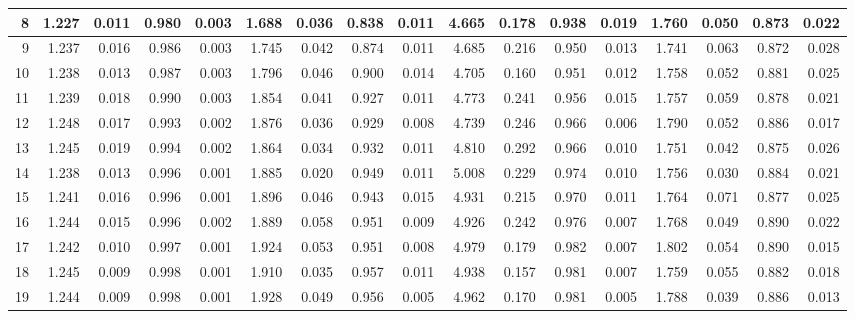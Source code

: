 \documentclass[
]{article}
\begin{document}
\begin{table}[H]
{\begin{tabular}[t]{r|r|r|r|r|r|r|r|r|r|r|r|r|r|r|r|r}
\hline
\hspace{1em}8 & 1.227 & 0.011 & 0.980 & 0.003 & 1.688 & 0.036 & 0.838 & 0.011 & 4.665 & 0.178 & 0.938 & 0.019 & 1.760 & 0.050 & 0.873 & 0.022\\
\hline
\hspace{1em}9 & 1.237 & 0.016 & 0.986 & 0.003 & 1.745 & 0.042 & 0.874 & 0.011 & 4.685 & 0.216 & 0.950 & 0.013 & 1.741 & 0.063 & 0.872 & 0.028\\
\hline
\hspace{1em}10 & 1.238 & 0.013 & 0.987 & 0.003 & 1.796 & 0.046 & 0.900 & 0.014 & 4.705 & 0.160 & 0.951 & 0.012 & 1.758 & 0.052 & 0.881 & 0.025\\
\hline
\hspace{1em}11 & 1.239 & 0.018 & 0.990 & 0.003 & 1.854 & 0.041 & 0.927 & 0.011 & 4.773 & 0.241 & 0.956 & 0.015 & 1.757 & 0.059 & 0.878 & 0.021\\
\hline
\hspace{1em}12 & 1.248 & 0.017 & 0.993 & 0.002 & 1.876 & 0.036 & 0.929 & 0.008 & 4.739 & 0.246 & 0.966 & 0.006 & 1.790 & 0.052 & 0.886 & 0.017\\
\hline
\hspace{1em}13 & 1.245 & 0.019 & 0.994 & 0.002 & 1.864 & 0.034 & 0.932 & 0.011 & 4.810 & 0.292 & 0.966 & 0.010 & 1.751 & 0.042 & 0.875 & 0.026\\
\hline
\hspace{1em}14 & 1.238 & 0.013 & 0.996 & 0.001 & 1.885 & 0.020 & 0.949 & 0.011 & 5.008 & 0.229 & 0.974 & 0.010 & 1.756 & 0.030 & 0.884 & 0.021\\
\hline
\hspace{1em}15 & 1.241 & 0.016 & 0.996 & 0.001 & 1.896 & 0.046 & 0.943 & 0.015 & 4.931 & 0.215 & 0.970 & 0.011 & 1.764 & 0.071 & 0.877 & 0.025\\
\hline
\hspace{1em}16 & 1.244 & 0.015 & 0.996 & 0.002 & 1.889 & 0.058 & 0.951 & 0.009 & 4.926 & 0.242 & 0.976 & 0.007 & 1.768 & 0.049 & 0.890 & 0.022\\
\hline
\hspace{1em}17 & 1.242 & 0.010 & 0.997 & 0.001 & 1.924 & 0.053 & 0.951 & 0.008 & 4.979 & 0.179 & 0.982 & 0.007 & 1.802 & 0.054 & 0.890 & 0.015\\
\hline
\hspace{1em}18 & 1.245 & 0.009 & 0.998 & 0.001 & 1.910 & 0.035 & 0.957 & 0.011 & 4.938 & 0.157 & 0.981 & 0.007 & 1.759 & 0.055 & 0.882 & 0.018\\
\hline
\hspace{1em}19 & 1.244 & 0.009 & 0.998 & 0.001 & 1.928 & 0.049 & 0.956 & 0.005 & 4.962 & 0.170 & 0.981 & 0.005 & 1.788 & 0.039 & 0.886 & 0.013\\

\end{tabular}}
\end{table}
\end{document}

